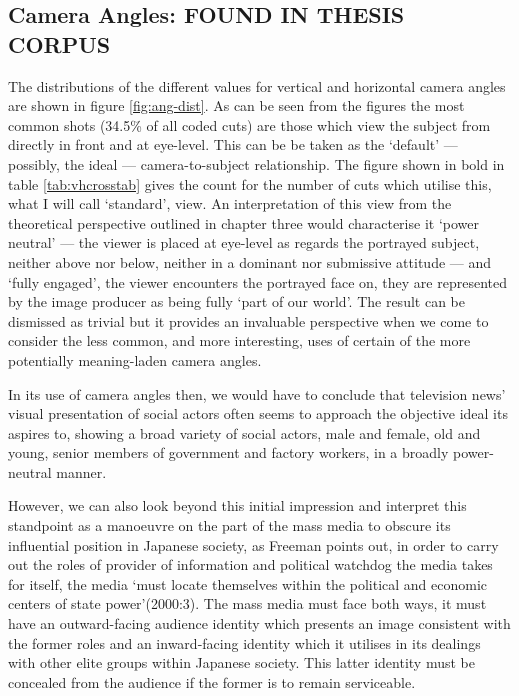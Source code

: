 \subsection{Camera Angles: FOUND IN THESIS CORPUS}
The distributions of the different values for vertical and horizontal camera angles are shown in figure \ref{fig:ang-dist}. As can be seen from the figures the most common shots (34.5\% of all coded cuts) are those which view the subject from directly in front and at eye-level. This can be be taken as the `default' --- possibly, the ideal --- camera-to-subject relationship. The figure shown in bold in table \ref{tab:vhcrosstab} gives the count for the number of cuts which utilise this, what I will call `standard', view. An interpretation of this view from the theoretical perspective outlined in chapter three would characterise it `power neutral' --- the viewer is placed at eye-level as regards the portrayed subject, neither above nor below, neither in a dominant nor submissive attitude --- and `fully engaged', the viewer encounters the portrayed face on, they are represented by the image producer as being fully `part of our world'. The result can be dismissed as trivial but it provides an invaluable perspective when we come to consider the less common, and more interesting, uses of certain of the more potentially meaning-laden camera angles.

In its use of camera angles then, we would have to conclude that television news' visual presentation of social actors often seems to approach the objective ideal its aspires to, showing a broad variety of social actors, male and female, old and young, senior members of government and factory workers, in a broadly power-neutral manner. 

However, we can also look beyond this initial impression and interpret this standpoint as a manoeuvre on the part of the mass media to obscure its influential position in Japanese society, as Freeman points out, in order to carry out the roles of provider of information and political watchdog the media takes for itself, the media `must locate themselves within the political and economic centers of state power'(2000:3)\nocite{Freeman:2000}. The mass media must face both ways, it must have an outward-facing audience identity which presents an image consistent with the former roles and an inward-facing identity which it utilises in its dealings with other elite groups within Japanese society. This latter identity must be concealed from the audience if the former is to remain serviceable. 

